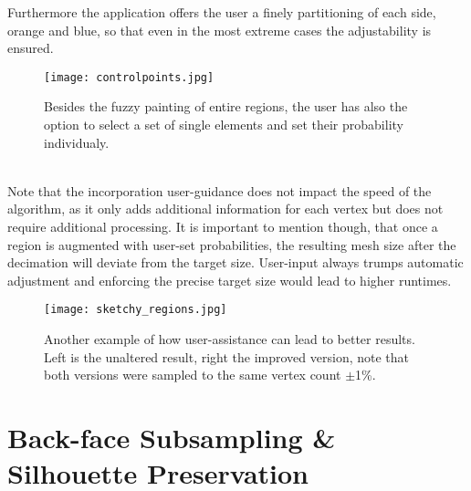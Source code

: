 Furthermore the application offers the user a finely partitioning of each side, orange and blue, so that even in the most extreme cases the adjustability is ensured. 
\begin{figure}[ht]
\centering
\texttt{[image: controlpoints.jpg]}
\caption{Besides the fuzzy painting of entire regions, the user has also the option to select a set of single elements and set their probability individualy.}
\label{fig:controlpoints}
\end{figure}\\
Note that the incorporation user-guidance does not impact the speed of the algorithm, as it only adds additional information for each vertex but does not require additional processing.
It is important to mention though, that once a region is augmented with user-set probabilities, the resulting mesh size after the decimation will deviate from the target size.
User-input always trumps automatic adjustment and enforcing the precise target size would lead to higher runtimes. 
\begin{figure}[ht]
\centering
\texttt{[image: sketchy\_regions.jpg]}
\caption{Another example of how user-assistance can lead to better results. Left is the unaltered result, right the improved version, note that both versions were sampled to the same vertex count $\pm$1\%.}
\label{fig:sketchy_regions}
\end{figure}

\newpage
\section{Back-face Subsampling \& Silhouette Preservation}
\label{topstoc41}

